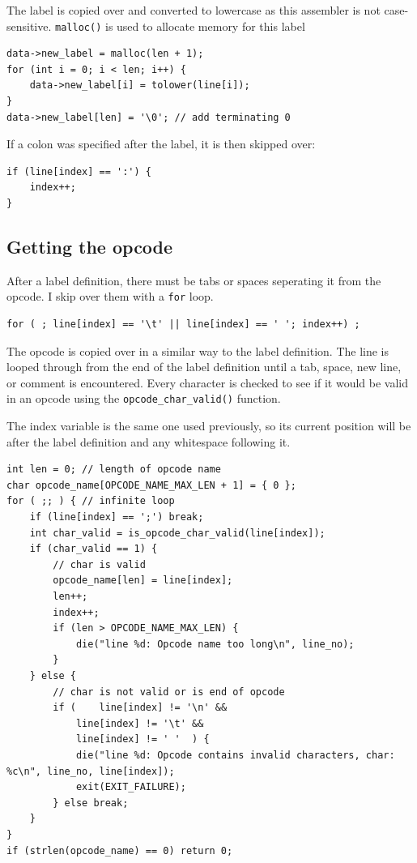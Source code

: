 \documentclass[a4paper]{report}
\begin{document}
The label is copied over and converted to lowercase as this assembler is not
case-sensitive. \texttt{malloc()} is used to allocate memory for this label

\begin{lstlisting}
data->new_label = malloc(len + 1);
for (int i = 0; i < len; i++) {
	data->new_label[i] = tolower(line[i]);
}
data->new_label[len] = '\0'; // add terminating 0
\end{lstlisting}

If a colon was specified after the label, it is then skipped over:

\begin{lstlisting}
if (line[index] == ':') {
	index++;
}
\end{lstlisting}

\subsection{Getting the opcode}

After a label definition, there must be tabs or spaces seperating it from the
opcode. I skip over them with a \texttt{for} loop.

\begin{lstlisting}
for ( ; line[index] == '\t' || line[index] == ' '; index++) ;
\end{lstlisting}

The opcode is copied over in a similar way to the label definition. The line
is looped through from the end of the label definition until a tab, space,
new line, or comment is encountered. Every character is checked to see if it
would be valid in an opcode using the \texttt{opcode\_char\_valid()} function.

The index variable is the same one used previously, so its current position will
be after the label definition and any whitespace following it.

\begin{lstlisting}
int len = 0; // length of opcode name
char opcode_name[OPCODE_NAME_MAX_LEN + 1] = { 0 };
for ( ;; ) { // infinite loop
	if (line[index] == ';') break;
	int char_valid = is_opcode_char_valid(line[index]);
	if (char_valid == 1) {
		// char is valid
		opcode_name[len] = line[index];
		len++;
		index++;
		if (len > OPCODE_NAME_MAX_LEN) {
			die("line %d: Opcode name too long\n", line_no);
		}
	} else {
		// char is not valid or is end of opcode
		if (	line[index] != '\n' &&
			line[index] != '\t' &&
			line[index] != ' '	) {
			die("line %d: Opcode contains invalid characters, char: %c\n", line_no, line[index]);
			exit(EXIT_FAILURE);
		} else break;
	}
}
if (strlen(opcode_name) == 0) return 0;
\end{lstlisting}
\end{document}
